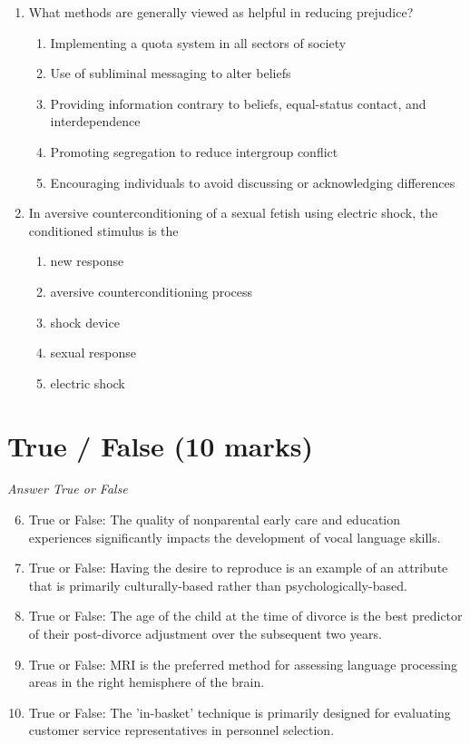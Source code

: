 \documentclass[12pt]{article}
\begin{document}
\begin{enumerate}[label=\arabic*.]
\begin{enumerate}[label=(\alph*)]
    \item most motor functions correlate highly and form 2 single factor
\end{enumerate}
\item What methods are generally viewed as helpful in reducing prejudice?
\begin{enumerate}[label=(\alph*)]
    \item Implementing a quota system in all sectors of society
    \item Use of subliminal messaging to alter beliefs
    \item Providing information contrary to beliefs, equal-status contact, and interdependence
    \item Promoting segregation to reduce intergroup conflict
    \item Encouraging individuals to avoid discussing or acknowledging differences
\end{enumerate}
\item In aversive counterconditioning of a sexual fetish using electric shock, the conditioned stimulus is the
\begin{enumerate}[label=(\alph*)]
    \item new response
    \item aversive counterconditioning process
    \item shock device
    \item sexual response
    \item electric shock
\end{enumerate}
\end{enumerate}

\section*{True / False (10 marks)}
\textit{Answer True or False}
\begin{enumerate}[label=\arabic*.]
\setcounter{enumi}{5}
\item True or False: The quality of nonparental early care and education experiences significantly impacts the development of vocal language skills.
\item True or False: Having the desire to reproduce is an example of an attribute that is primarily culturally-based rather than psychologically-based.
\item True or False: The age of the child at the time of divorce is the best predictor of their post-divorce adjustment over the subsequent two years.
\item True or False: MRI is the preferred method for assessing language processing areas in the right hemisphere of the brain.
\item True or False: The 'in-basket' technique is primarily designed for evaluating customer service representatives in personnel selection.
\end{enumerate}
\end{document}
